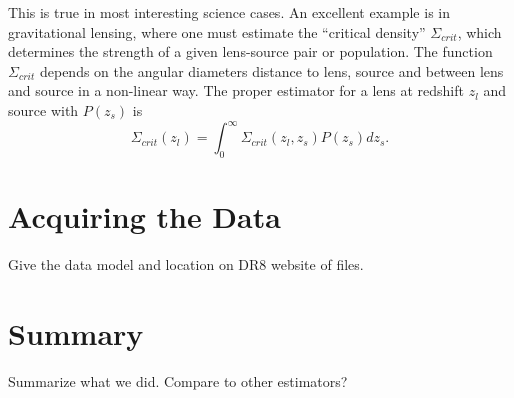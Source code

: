 \documentclass{emulateapj}
\begin{document}
This is true in most interesting science cases.  An excellent example is in
gravitational lensing, where one must estimate the ``critical density''
$\Sigma_{crit}$, which determines the strength of a given lens-source pair or
population.  The function $\Sigma_{crit}$ depends on the angular diameters
distance to lens, source and between lens and source in a non-linear way.  The
proper estimator for a lens at redshift $z_{l}$ and source with $P(z_s)$ is
\begin{equation}
\Sigma_{crit}(z_l) = \int_{0}^{\infty} \Sigma_{crit}(z_l, z_s) P(z_s) dz_s.
\end{equation}

\section{Acquiring the Data}

{\color{red} Give the data model and location on DR8 website of files. }

\section{Summary}

Summarize what we did.  Compare to other estimators?



\end{document}
